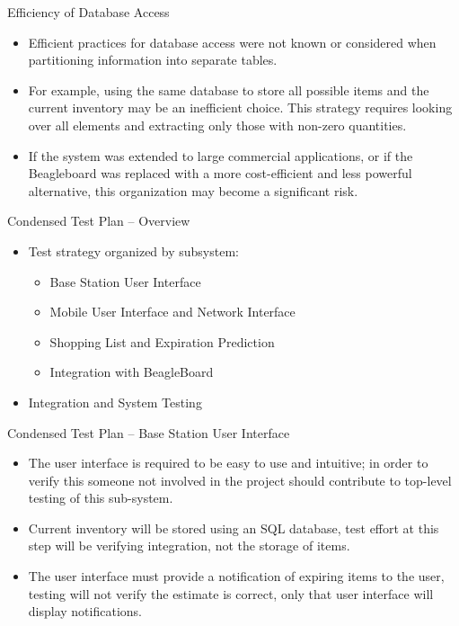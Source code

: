 \documentclass[t]{beamer}
\begin{document}
\begin{frame}{Efficiency of Database Access}
\begin{itemize}
\item Efficient practices for database access were not known or considered when partitioning information into separate tables.
\item For example, using the same database to store all possible items and the current inventory may be an inefficient choice. This strategy requires looking over all elements and extracting only those with non-zero quantities.
\item If the system was extended to large commercial applications, or if the Beagleboard was replaced with a more cost-efficient and less powerful alternative, this organization may become a significant risk.
\end{itemize}
\end{frame}

\begin{frame}{Condensed Test Plan -- Overview}
\begin{itemize}
\item Test strategy organized by subsystem:
\begin{itemize}
\item Base Station User Interface
\item Mobile User Interface and Network Interface
\item Shopping List and Expiration Prediction
\item Integration with BeagleBoard
\end{itemize}
\item Integration and System Testing
\end{itemize}
\end{frame}

\begin{frame}{Condensed Test Plan -- Base Station User Interface}
\begin{itemize}
\item The user interface is required to be easy to use and intuitive; in order to verify this someone not involved in the project should contribute to top-level testing of this sub-system.
\item Current inventory will be stored using an SQL database, test effort at this step will be verifying integration, not the storage of items.
\item The user interface must provide a notification of expiring items to the user, testing will not verify the estimate is correct, only that user interface will display notifications.
\end{itemize}
\end{frame}
\end{document}
